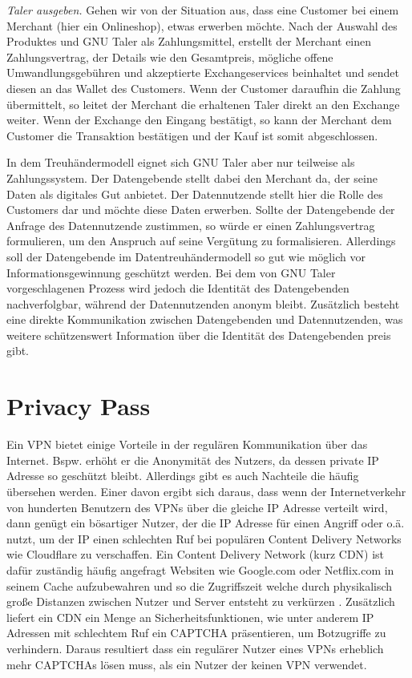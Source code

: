 \documentclass[11pt,a4paper]{scrreprt}
\begin{document}
\textit{Taler ausgeben.} Gehen wir von der Situation aus, dass eine Customer bei einem Merchant (hier ein Onlineshop), etwas erwerben möchte. Nach der Auswahl des Produktes und GNU Taler als Zahlungsmittel, erstellt der Merchant einen Zahlungsvertrag, der Details wie den Gesamtpreis, mögliche offene Umwandlungsgebühren und akzeptierte Exchangeservices beinhaltet und sendet diesen an das Wallet des Customers.  Wenn der Customer daraufhin die Zahlung übermittelt, so leitet der Merchant die erhaltenen Taler direkt an den Exchange weiter. Wenn der Exchange den Eingang bestätigt, so kann der Merchant dem Customer die Transaktion bestätigen und der Kauf ist somit abgeschlossen. 


In dem Treuhändermodell eignet sich GNU Taler aber nur teilweise als Zahlungssystem. Der Datengebende stellt dabei den Merchant da, der seine Daten als digitales Gut anbietet. Der Datennutzende stellt hier die Rolle des Customers dar und möchte diese Daten erwerben. Sollte der Datengebende der Anfrage des Datennutzende zustimmen, so würde er einen Zahlungsvertrag formulieren, um den Anspruch auf seine Vergütung zu formalisieren. Allerdings soll der Datengebende im Datentreuhändermodell so gut wie möglich vor Informationsgewinnung geschützt werden. Bei dem von GNU Taler vorgeschlagenen Prozess wird jedoch die Identität des Datengebenden nachverfolgbar, während der Datennutzenden anonym bleibt. Zusätzlich besteht eine direkte Kommunikation zwischen Datengebenden und Datennutzenden, was weitere schützenswert Information über die Identität des Datengebenden preis gibt.

\section{Privacy Pass}
\label{sec:privacy-pass}
Ein VPN bietet einige Vorteile in der regulären Kommunikation über das Internet. Bspw. erhöht er die Anonymität des Nutzers, da dessen private IP Adresse so geschützt bleibt. Allerdings gibt es auch Nachteile die häufig übersehen werden. Einer davon ergibt sich daraus, dass wenn der Internetverkehr von hunderten Benutzern des VPNs über die gleiche IP Adresse verteilt wird, dann genügt ein bösartiger Nutzer, der die IP Adresse für einen Angriff oder o.ä. nutzt, um der IP einen schlechten Ruf bei populären Content Delivery Networks wie Cloudflare zu verschaffen. Ein Content Delivery Network (kurz CDN) ist dafür zuständig häufig angefragt Websiten wie Google.com oder Netflix.com in seinem Cache aufzubewahren und so die Zugriffszeit welche durch physikalisch große Distanzen zwischen Nutzer und Server entsteht zu verkürzen \cite{pp-cdn}. Zusätzlich liefert ein CDN ein Menge an Sicherheitsfunktionen, wie unter anderem IP Adressen mit schlechtem Ruf ein CAPTCHA präsentieren, um Botzugriffe zu verhindern. Daraus resultiert dass ein regulärer Nutzer eines VPNs erheblich mehr CAPTCHAs lösen muss, als ein Nutzer der keinen VPN verwendet.
\end{document}
